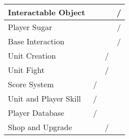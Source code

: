 \documentclass[12pt,oneside,openright,a4paper]{cpe-thai-project}
\begin{document}
\begin{table}[H]
\begin{tabular}{|lllc|}
  \multicolumn{1}{|l|}{Interactable Object}         & \multicolumn{1}{l|}{}                                                                       & \multicolumn{1}{l|}{}                                                                   & /                     \\ \hline
  \multicolumn{1}{|l|}{Player Sugar}                & \multicolumn{1}{l|}{}                                                                       & \multicolumn{1}{l|}{}                                                                   & /                     \\ \hline
  \multicolumn{1}{|l|}{Base Interaction}            & \multicolumn{1}{l|}{}                                                                       & \multicolumn{1}{l|}{}                                                                   & /                     \\ \hline
  \multicolumn{1}{|l|}{Unit Creation}               & \multicolumn{1}{l|}{}                                                                       & \multicolumn{1}{c|}{/}                                                                  & \multicolumn{1}{l|}{} \\ \hline
  \multicolumn{1}{|l|}{Unit Fight}                  & \multicolumn{1}{l|}{}                                                                       & \multicolumn{1}{c|}{/}                                                                  & \multicolumn{1}{l|}{} \\ \hline
  \multicolumn{1}{|l|}{Score System}                & \multicolumn{1}{c|}{/}                                                                      & \multicolumn{1}{l|}{}                                                                   & \multicolumn{1}{l|}{} \\ \hline
  \multicolumn{1}{|l|}{Unit and Player Skill}       & \multicolumn{1}{c|}{/}                                                                      & \multicolumn{1}{l|}{}                                                                   & \multicolumn{1}{l|}{} \\ \hline
  \multicolumn{1}{|l|}{Player Database}             & \multicolumn{1}{c|}{/}                                                                      & \multicolumn{1}{l|}{}                                                                   & \multicolumn{1}{l|}{} \\ \hline
  \multicolumn{1}{|l|}{Shop and Upgrade}            & \multicolumn{1}{l|}{}                                                                       & \multicolumn{1}{c|}{/}                                                                  & \multicolumn{1}{l|}{} \\ \hline

\end{tabular}
\end{table}
\end{document}
